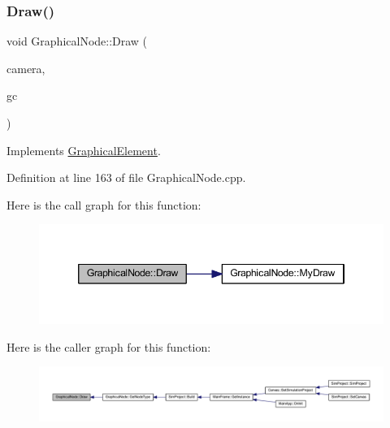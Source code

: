 \subsubsection{\texorpdfstring{Draw()}{Draw()}}
{\footnotesize\ttfamily void Graphical\+Node\+::\+Draw (\begin{DoxyParamCaption}\item[{const wx\+Affine\+Matrix2D \&}]{camera,  }\item[{wx\+Graphics\+Context $\ast$}]{gc }\end{DoxyParamCaption})\hspace{0.3cm}{\ttfamily [virtual]}}



Implements \hyperlink{class_graphical_element_ab137d6d3ad82fd08b5610519dda0c600}{Graphical\+Element}.



Definition at line 163 of file Graphical\+Node.\+cpp.

Here is the call graph for this function\+:
\nopagebreak
\begin{figure}[H]
\begin{center}
\leavevmode
\includegraphics[width=346pt]{class_graphical_node_a5675edef9951820c61973cd8fb242287_cgraph}
\end{center}
\end{figure}
Here is the caller graph for this function\+:
\nopagebreak
\begin{figure}[H]
\begin{center}
\leavevmode
\includegraphics[width=350pt]{class_graphical_node_a5675edef9951820c61973cd8fb242287_icgraph}
\end{center}
\end{figure}
\mbox{\label{class_graphical_node_a29991fc9117db0975aa1a61d0df48822}} 
